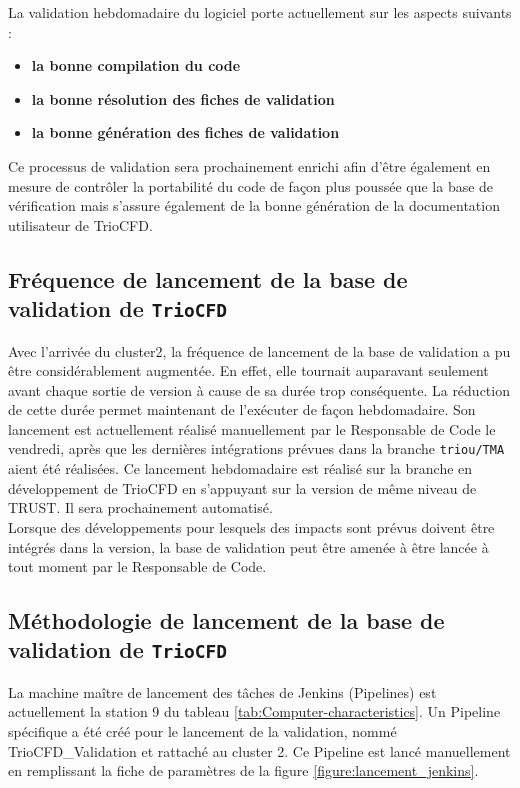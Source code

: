 La validation hebdomadaire du logiciel porte actuellement sur les aspects suivants :
\begin{itemize}[label=$\Rightarrow$, font=\LARGE]
   \item \textbf{la bonne compilation du code}
   \item \textbf{la bonne résolution des fiches de validation}
   \item \textbf{la bonne génération des fiches de validation}
\end{itemize}

Ce processus de validation sera prochainement enrichi afin d'être également en mesure de contrôler la portabilité du code de façon plus poussée que la base de vérification mais s'assure également de la bonne génération de la documentation utilisateur de TrioCFD.\\

\subsection{Fréquence de lancement de la base de validation de \texttt{TrioCFD}}
Avec l'arrivée du cluster2, la fréquence de lancement de la base de validation a pu être considérablement augmentée. En effet, elle tournait auparavant seulement avant chaque sortie de version à cause de sa durée trop conséquente. La réduction de cette durée permet maintenant de l'exécuter de façon hebdomadaire. Son lancement est actuellement réalisé manuellement par le Responsable de Code le vendredi, après que les dernières intégrations prévues dans la branche \texttt{triou/TMA} aient été réalisées. Ce lancement hebdomadaire est réalisé sur la branche en développement de TrioCFD en s'appuyant sur la version de même niveau de TRUST. Il sera prochainement automatisé.\\
Lorsque des développements pour lesquels des impacts sont prévus doivent être intégrés dans la version, la base de validation peut être amenée à être lancée à tout moment par le Responsable de Code.

\subsection{Méthodologie de lancement de la base de validation de \texttt{TrioCFD}}

La machine maître de lancement des tâches de Jenkins (Pipelines) est actuellement la station 9 du tableau \ref{tab:Computer-characteristics}. Un Pipeline spécifique a été créé pour le lancement de la validation, nommé TrioCFD\_Validation et rattaché au cluster 2. Ce Pipeline est lancé manuellement en remplissant la fiche de paramètres de la figure \ref{figure:lancement_jenkins}.

